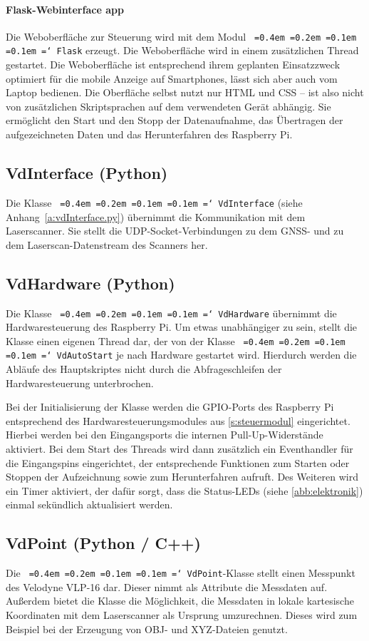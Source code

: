\documentclass[a4paper,12pt,bibliography=totoc, listof=totoc,titlepage,pointlessnumbers]{scrreprt}
\newcommand*\justify{%
  \fontdimen2\font=0.4em%
  \fontdimen3\font=0.2em%
  \fontdimen4\font=0.1em%
  \fontdimen7\font=0.1em%
  \hyphenchar\font=`\-%
}
\newcommand{\code}[1]{\texttt{\justify{#1}}}
\begin{document}
\paragraph{Flask-Webinterface app}
Die Weboberfläche zur Steuerung wird mit dem Modul \code{Flask} erzeugt. Die Weboberfläche wird in einem zusätzlichen Thread gestartet. Die Weboberfläche ist entsprechend ihrem geplanten Einsatzzweck optimiert für die mobile Anzeige auf Smartphones, lässt sich aber auch vom Laptop bedienen. Die Oberfläche selbst nutzt nur HTML und CSS -- ist also nicht von zusätzlichen Skriptsprachen auf dem verwendeten Gerät abhängig. 
Sie ermöglicht den Start und den Stopp der Datenaufnahme, das Übertragen der aufgezeichneten Daten und das Herunterfahren des Raspberry Pi.

\subsection{VdInterface (Python)}
Die Klasse \code{VdInterface} (siehe Anhang~\ref{a:vdInterface.py}) übernimmt die Kommunikation mit dem Laser\-scan\-ner. Sie stellt die UDP-Socket-Verbindungen zu dem GNSS- und zu dem Laserscan-Datenstream des Scanners her.


\subsection{VdHardware (Python)}
Die Klasse \code{VdHardware} übernimmt die Hardwaresteuerung des Rasp\-berry Pi. Um etwas unabhängiger zu sein, stellt die Klasse einen eigenen Thread dar, der von der Klasse \code{VdAutoStart} je nach Hardware gestartet wird. Hierdurch werden die Abläufe des Hauptskriptes nicht durch die Abfrageschleifen der Hardwaresteuerung unterbrochen.

Bei der Initialisierung der Klasse werden die GPIO-Ports des Rasp\-berry Pi entsprechend des Hardwaresteuerungsmodules aus \autoref{s:steuermodul} eingerichtet. Hierbei werden bei den Ein\-gangs\-ports die internen Pull-Up-Widerstände aktiviert. Bei dem Start des Threads wird dann zusätzlich ein Event\-handler für die Ein\-gang\-spins eingerichtet, der entsprechende Funktionen zum Starten oder Stoppen der Aufzeichnung sowie zum Herunterfahren aufruft. Des Weiteren wird ein Timer aktiviert, der dafür sorgt, dass die Status-LEDs (siehe \autoref{abb:elektronik}) einmal sekündlich aktualisiert werden.

\subsection{VdPoint (Python / C++)}
Die \code{VdPoint}-Klasse stellt einen Messpunkt des Velodyne VLP-16 dar. Dieser nimmt als Attribute die Messdaten auf. Außerdem bietet die Klasse die Möglichkeit, die Messdaten in lokale kartesische Koordinaten mit dem Laser\-scan\-ner als Ursprung umzurechnen. Dieses wird zum Beispiel bei der Erzeugung von OBJ- und XYZ-Dateien genutzt.
\end{document}
